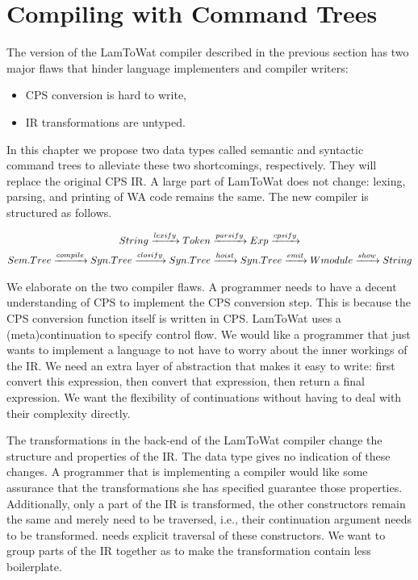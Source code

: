 
\chapter{\label{chap:treecomp}Compiling with Command Trees}
The version of the LamToWat compiler described in the previous section has two major flaws that hinder language implementers and compiler writers:

\begin{itemize}
\item \ac{CPS} conversion is hard to write,
\item \ac{IR} transformations are untyped.
\end{itemize}

In this chapter we propose two data types called semantic and syntactic command trees to alleviate these two shortcomings, respectively. They will replace the original \ac{CPS} \ac{IR}. A large part of LamToWat does not change: lexing, parsing, and printing of \ac{WA} code remains the same. The new compiler is structured as follows.

\begin{gather*}
  String \xrightarrow{lexify} Token \xrightarrow{parsify} Exp \xrightarrow{cpsify}\\
  Sem.Tree \xrightarrow{compile} Syn.Tree \xrightarrow{closify} Syn.Tree \xrightarrow{hoist} Syn.Tree \xrightarrow{emit} Wmodule \xrightarrow{show} String
\end{gather*}

We elaborate on the two compiler flaws. A programmer needs to have a decent understanding of \ac{CPS} to implement the \ac{CPS} conversion step. This is because the \ac{CPS} conversion function itself is written in \ac{CPS}. LamToWat uses a (meta)continuation to specify control flow. We would like a programmer that just wants to implement a language to not have to worry about the inner workings of the \ac{IR}. We need an extra layer of abstraction that makes it easy to write: first convert this expression, then convert that expression, then return a final expression. We want the flexibility of continuations without having to deal with their complexity directly.

The transformations in the back-end of the LamToWat compiler change the structure and properties of the \ac{IR}. The  data type gives no indication of these changes. A programmer that is implementing a compiler would like some assurance that the transformations she has specified guarantee those properties. Additionally, only a part of the \ac{IR} is transformed, the other constructors remain the same and merely need to be traversed, i.e., their continuation argument needs to be transformed.  needs explicit traversal of these constructors. We want to group parts of the \ac{IR} together as to make the transformation contain less boilerplate.

